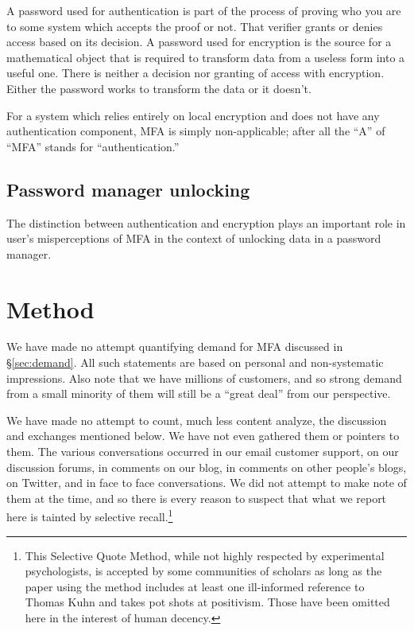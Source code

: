 \documentclass[12pt]{article}
\begin{document}
A password used for authentication is part of the process of proving who you are to some system which accepts the proof or not. That verifier grants or denies access based on its decision. A password used for encryption is the source for a mathematical object that is required to transform data from a useless form into a useful one. There is neither a decision nor granting of access with encryption. Either the password works to transform the data or it doesn't.

For a system which relies entirely on local encryption and does not have any authentication component, MFA is simply non-applicable;
after all the “A” of “MFA” stands for “authentication.” 

\subsection{Password manager unlocking}

The distinction between authentication and encryption plays an important role in user's misperceptions of MFA in the context of unlocking data in a password manager. 

\section{Method}

We have made no attempt quantifying demand for MFA discussed in \S\ref{sec:demand}.
All such statements are based on personal and non-systematic impressions.
Also note that we have millions of customers,
and so strong demand from a small minority of them will still be a “great deal” from our perspective.

We have made no attempt to count, much less content analyze, the discussion and exchanges mentioned below.
We have not even gathered them or pointers to them.
The various conversations occurred in our email customer support,
on our discussion forums,
in comments on our blog,
in comments on other people's blogs,
on Twitter,
and in face to face conversations. 
We did not attempt to make note of them at the time,
and so there is every reason to suspect that what we report here is tainted by selective recall.\footnote
  {This Selective Quote Method,
  while not highly respected by experimental psychologists,
  is accepted by some communities of scholars
  as long as the paper using the method includes
  at least one ill-informed reference to Thomas Kuhn
  and takes pot shots at positivism.
  Those have been omitted here in the interest of human decency.}
\end{document}
